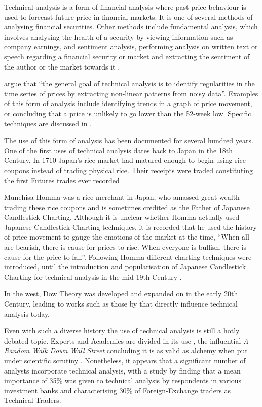 \documentclass[12pt, oneside, a4paper]{article}
\theoremstyle{definition}
\begin{document}
Technical analysis is a form of financial analysis where past price behaviour is used to forecast future price in financial markets. It is one of several methods of analysing financial securities. Other methods include fundamental analysis, which involves analysing the health of a security by viewing information such as company earnings, and sentiment analysis, performing analysis on written text or speech regarding a financial security or market and extracting the sentiment of the author or the market towards it \citep{ahmad2011affective}.

\cite{foundations} argue that ``the general goal of technical analysis is to identify regularities in the time series of prices by extracting non-linear patterns from noisy data''. Examples of this form of analysis include identifying trends in a graph of price movement, or concluding that a price is unlikely to go lower than the 52-week low. Specific techniques are discussed in .

The use of this form of analysis has been documented for several hundred years. One of the first uses of technical analysis dates back to Japan in the 18th Century. In 1710 Japan's rice market had matured enough to begin using rice coupons instead of trading physical rice. Their receipts were traded constituting the first Futures trades ever recorded \citep[p.~15]{jcct1991}. 

Munehisa Homma was a rice merchant in Japan, who amassed great wealth trading these rice coupons and is sometimes credited as the Father of Japanese Candlestick Charting. Although it is unclear whether Homma actually used Japanese Candlestick Charting techniques, it is recorded that he used the history of price movement to gauge the emotions of the market at the time, ``When all are bearish, there is cause for prices to rise. When everyone is bullish, there is cause for the price to fall''. Following Homma different charting techniques were introduced, until the introduction and popularisation of Japanese Candlestick Charting for technical analysis in the mid 19th Century \citep[p.~18]{jcct1994}.

In the west, Dow Theory was developed and expanded on in the early 20th Century, leading to works such as those by \cite{edwards1948technical} that directly influence technical analysis today.

Even with such a diverse history the use of technical analysis is still a hotly debated topic. Experts and Academics are divided in its use \citep{foundations}, the influential \textit{A Random Walk Down Wall Street} concluding it is as valid as alchemy when put under scientific scrutiny \cite[p.~159]{randomwalk2012}. Nonetheless, it appears that a significant number of analysts incorporate technical analysis, with a study by \cite{examininguse1997} finding that a mean importance of 35\% was given to technical analysis by respondents in various investment banks and \cite{cheung2000currency} characterising 30\% of Foreign-Exchange traders as Technical Traders. 
\end{document}
